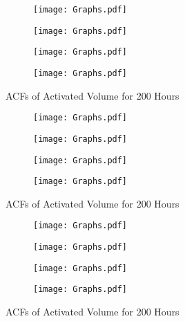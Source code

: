 \documentclass[12pt]{article}
\begin{document}
\begin{appendix}
\newpage
\begin{figure}
\centering
\begin{subfigure}{.5\textwidth}
  \centering
  \texttt{[image: Graphs.pdf]}
\end{subfigure}%
\begin{subfigure}{.5\textwidth}
  \centering
  \texttt{[image: Graphs.pdf]}
\end{subfigure}
\begin{subfigure}{.5\textwidth}
  \centering
  \texttt{[image: Graphs.pdf]}
\end{subfigure}%
\begin{subfigure}{.5\textwidth}
  \centering
  \texttt{[image: Graphs.pdf]}
\end{subfigure}
\caption{ACFs of Activated Volume for 200 Hours}
\label{figure:ACFshorter3}
\end{figure}


\newpage
\begin{figure}
\centering
\begin{subfigure}{.5\textwidth}
  \centering
  \texttt{[image: Graphs.pdf]}
\end{subfigure}%
\begin{subfigure}{.5\textwidth}
  \centering
  \texttt{[image: Graphs.pdf]}
\end{subfigure}
\begin{subfigure}{.5\textwidth}
  \centering
  \texttt{[image: Graphs.pdf]}
\end{subfigure}%
\begin{subfigure}{.5\textwidth}
  \centering
  \texttt{[image: Graphs.pdf]}
\end{subfigure}
\caption{ACFs of Activated Volume for 200 Hours}
\label{figure:ACFshorter4}
\end{figure}


\newpage
\begin{figure}
\centering
\begin{subfigure}{.5\textwidth}
  \centering
  \texttt{[image: Graphs.pdf]}
\end{subfigure}%
\begin{subfigure}{.5\textwidth}
  \centering
  \texttt{[image: Graphs.pdf]}
\end{subfigure}
\begin{subfigure}{.5\textwidth}
  \centering
  \texttt{[image: Graphs.pdf]}
\end{subfigure}%
\begin{subfigure}{.5\textwidth}
  \centering
  \texttt{[image: Graphs.pdf]}
\end{subfigure}
\caption{ACFs of Activated Volume for 200 Hours}
\label{figure:ACFshorter5}
\end{figure}




\end{appendix}
\end{document}
